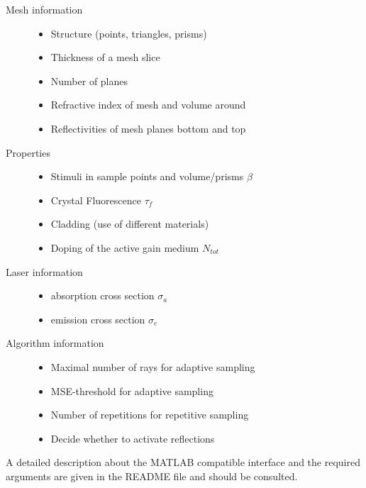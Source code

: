 \begin{description}
  \label{label:input}
  \item[Mesh information]\mbox{}
    \begin{itemize}
      \setlength{\itemindent}{-2.5em}
    \item Structure (points, triangles, prisms)
    \item Thickness of a mesh slice 
    \item Number of planes
    \item Refractive index of mesh and volume around
    \item Reflectivities of mesh planes bottom and top
    \end{itemize}

  \item[Properties]
    \mbox{}
    \begin{itemize}
      \setlength{\itemindent}{-2.5em}
      \item Stimuli in sample points and volume/prisms $\beta$
      \item Crystal Fluorescence $\tau_{f}$
      \item Cladding (use of different materials)
      \item Doping of the active gain medium $N_{tot}$
    \end{itemize}

  \item[Laser information]
    \mbox{}
    \begin{itemize}
      \setlength{\itemindent}{-2.5em}
      \item absorption cross section $\sigma_a$
      \item emission cross section $\sigma_e$
    \end{itemize}

   \item[Algorithm information]
    \mbox{}
    \begin{itemize}
      \setlength{\itemindent}{-2.5em}
       \item Maximal number of rays for adaptive sampling
       \item MSE-threshold for adaptive sampling
       \item Number of repetitions for repetitive sampling
       \item Decide whether to activate reflections
     \end{itemize}
    
 \end{description}
A detailed description about the MATLAB compatible interface
and the required arguments are given in the README file 
and should be consulted.


